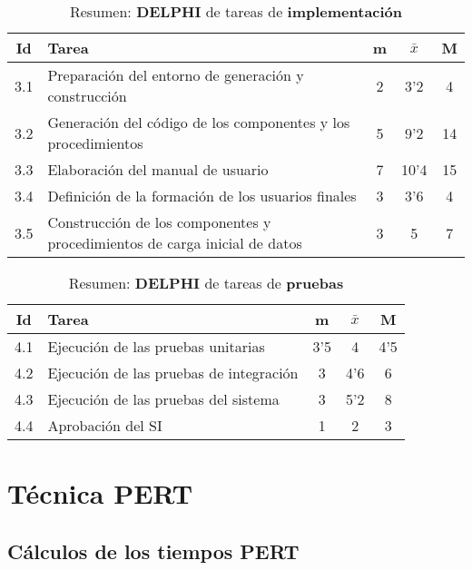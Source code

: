 \documentclass[11pt,a4paper,spanish,twoside]{report}
\begin{document}
\begin{table}[!h]
\centering
  \begin{tabular}{|c||p{8cm}||c|c|c|}
    \hline
    \textbf{Id} & \textbf{Tarea} & \textbf{m} & 
    \textbf{$\bar{x}$} &\textbf{M} \\
    \hline
    3.1 & Preparación del entorno de generación y construcción & 2 & 3'2  & 4 \\
    \hline
    3.2 & Generación del código de los componentes y los procedimientos & 5 &
    9'2 & 14\\
    \hline
    3.3 & Elaboración del manual de usuario & 7 & 10'4 & 15\\
    \hline
    3.4 & Definición de la formación de los usuarios finales & 3 & 3'6 & 4 \\
    \hline
    3.5 & Construcción de los componentes y procedimientos de carga inicial
    de datos & 3 & 5 & 7\\
    \hline
  \end{tabular}
  \caption{Resumen: \textbf{DELPHI} de tareas de \textbf{implementación}}
  \label{Tab:rDELPHIimp}
\end{table}

\begin{table}[!h]
\centering
  \begin{tabular}{|c||p{8cm}||c|c|c|}
    \hline
    \textbf{Id} & \textbf{Tarea} & \textbf{m} & 
    \textbf{$\bar{x}$} &\textbf{M} \\
    \hline
    4.1 & Ejecución de las pruebas unitarias & 3'5 & 4 & 4'5\\
    \hline
    4.2 & Ejecución de las pruebas de integración & 3 & 4'6 & 6\\
    \hline
    4.3 & Ejecución de las pruebas del sistema & 3 & 5'2 & 8\\
    \hline
    4.4 & Aprobación del SI & 1 & 2 & 3 \\
    \hline
  \end{tabular}
  \caption{Resumen: \textbf{DELPHI} de tareas de \textbf{pruebas}}
  \label{Tab:rDELPHIpru}
\end{table}


\chapter{Técnica PERT}
\section{Cálculos de los tiempos PERT}
\end{document}
